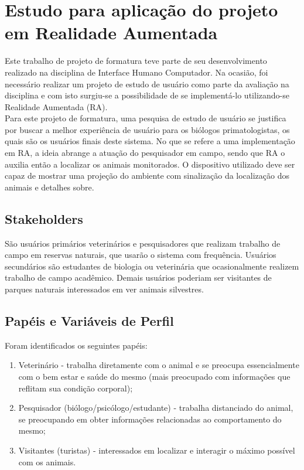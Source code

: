 \chapter{Estudo para aplicação do projeto em Realidade Aumentada}

Este trabalho de projeto de formatura teve parte de seu desenvolvimento realizado na disciplina de Interface Humano Computador. Na ocasião, foi necessário realizar um projeto de estudo de usuário como parte da avaliação na disciplina e com isto surgiu-se a possibilidade de se implementá-lo utilizando-se Realidade Aumentada (RA).\\

Para este projeto de formatura, uma pesquisa de estudo de usuário se justifica por buscar a melhor experiência de usuário para os biólogos primatologistas, os quais são os usuários finais deste sistema.
No que se refere a uma implementação em RA, a ideia abrange a atuação do pesquisador em campo, sendo que RA o auxilia então a localizar os animais monitorados. O dispositivo utilizado deve ser capaz de mostrar uma projeção do ambiente com sinalização da localização dos animais e detalhes sobre.

\section{Stakeholders}

São usuários primários veterinários e pesquisadores que realizam trabalho de campo em reservas naturais, que usarão o sistema com frequência. Usuários secundários são estudantes de biologia ou veterinária que ocasionalmente realizem trabalho de campo acadêmico. Demais usuários poderiam ser visitantes de parques naturais interessados em ver animais silvestres.

\section{Papéis e Variáveis de Perfil}

Foram identificados os seguintes papéis:

\begin{enumerate}
\item Veterinário - trabalha diretamente com o animal e se preocupa essencialmente com o bem estar e saúde do mesmo (mais preocupado com informações que reflitam sua condição corporal);
\item Pesquisador (biólogo/psicólogo/estudante) - trabalha distanciado do animal, se preocupando em obter informações relacionadas ao comportamento do mesmo;
\item Visitantes (turistas) - interessados em localizar e interagir o máximo possível com os animais.
\end{enumerate}

